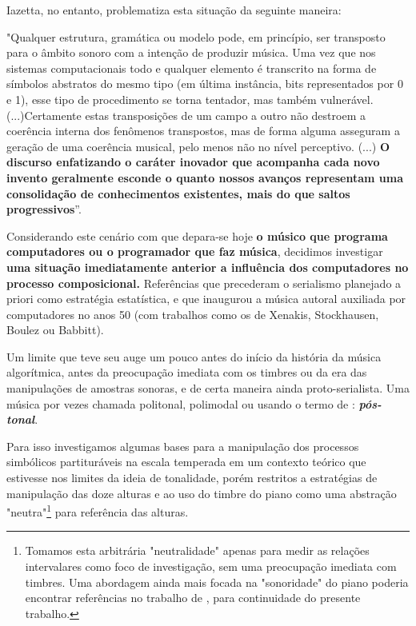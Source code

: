 \documentclass[
	12pt,				%
	openright,			%
	twoside,			%
	a4paper,			%
	english,			%
	french,				%
	spanish,			%
	brazil				%
	]{abntex2}
\begin{document}
Iazetta, no entanto, problematiza esta situação da seguinte maneira:


\begin{citacao}
"Qualquer estrutura, gramática ou modelo pode, em princípio, ser transposto para o âmbito sonoro com a intenção de produzir música. Uma vez que nos sistemas computacionais todo e qualquer elemento é transcrito na forma de símbolos abstratos do mesmo tipo (em última instância, bits representados por 0 e 1), esse tipo de procedimento se torna tentador, mas também vulnerável.(...)Certamente estas transposições de um campo a outro não destroem a coerência interna dos fenômenos transpostos, mas de forma alguma asseguram a  geração de uma coerência musical, pelo menos não no nível perceptivo.
(...)
\textbf{O discurso enfatizando o caráter inovador que acompanha cada novo invento geralmente esconde o quanto nossos avanços representam uma consolidação  de conhecimentos existentes, mais do que saltos progressivos}”. \cite[p. 151-153, grifo nosso.]{iazzetta2009musica}
\end{citacao}

Considerando este cenário com que depara-se hoje \textbf{o músico que programa computadores ou o programador que faz música}, decidimos investigar \textbf{uma situação imediatamente anterior a influência dos computadores no processo composicional.} Referências que precederam o serialismo planejado a priori como estratégia estatística, e que inaugurou a música autoral auxiliada por computadores no anos 50 (com trabalhos como os de Xenakis, Stockhausen, Boulez ou Babbitt).

Um limite que teve seu auge um pouco antes do início da história da música algorítmica, antes da preocupação imediata com os timbres ou da era das manipulações de amostras sonoras, e de certa maneira ainda proto-serialista. Uma música por vezes chamada politonal, polimodal ou usando o termo de : \textit{\textbf{pós-tonal}}. 

Para isso investigamos algumas bases para a manipulação dos processos simbólicos partituráveis na escala temperada em um contexto teórico que estivesse nos limites da ideia de tonalidade, porém restritos a estratégias de manipulação das doze alturas e ao uso do timbre do piano como uma abstração "neutra"\footnote{Tomamos esta arbitrária "neutralidade" apenas para medir as relações intervalares como foco de investigação, sem uma preocupação imediata com timbres. Uma abordagem ainda mais focada na "sonoridade" do piano poderia encontrar referências no trabalho de , para continuidade do presente trabalho. } para referência das alturas.
\end{document}
